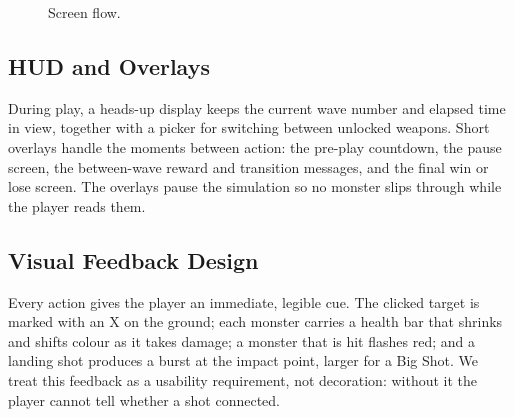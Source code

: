 \documentclass[12pt,a4paper]{report}
\begin{document}
\begin{figure}[h]
\centering
{}
\caption{Screen flow.}
\label{fig:flow}
\end{figure}

\subsection{HUD and Overlays}

During play, a heads-up display keeps the current wave number and elapsed time
in view, together with a picker for switching between unlocked weapons. Short
overlays handle the moments between action: the pre-play countdown, the pause
screen, the between-wave reward and transition messages, and the final win or
lose screen. The overlays pause the simulation so no monster slips through while
the player reads them.

\subsection{Visual Feedback Design}

Every action gives the player an immediate, legible cue. The clicked target is
marked with an X on the ground; each monster carries a health bar that shrinks
and shifts colour as it takes damage; a monster that is hit flashes red; and a
landing shot produces a burst at the impact point, larger for a Big Shot. We
treat this feedback as a usability requirement, not decoration: without it the
player cannot tell whether a shot connected.
\end{document}

